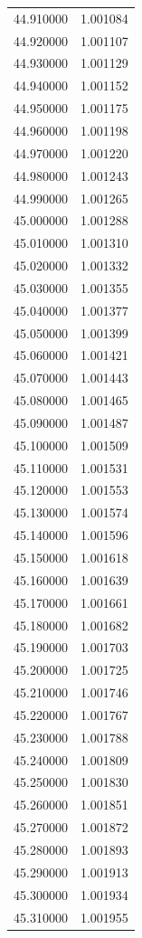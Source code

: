 \begin{tabular}{rr}
44.910000 & 1.001084 \\
44.920000 & 1.001107 \\
44.930000 & 1.001129 \\
44.940000 & 1.001152 \\
44.950000 & 1.001175 \\
44.960000 & 1.001198 \\
44.970000 & 1.001220 \\
44.980000 & 1.001243 \\
44.990000 & 1.001265 \\
45.000000 & 1.001288 \\
45.010000 & 1.001310 \\
45.020000 & 1.001332 \\
45.030000 & 1.001355 \\
45.040000 & 1.001377 \\
45.050000 & 1.001399 \\
45.060000 & 1.001421 \\
45.070000 & 1.001443 \\
45.080000 & 1.001465 \\
45.090000 & 1.001487 \\
45.100000 & 1.001509 \\
45.110000 & 1.001531 \\
45.120000 & 1.001553 \\
45.130000 & 1.001574 \\
45.140000 & 1.001596 \\
45.150000 & 1.001618 \\
45.160000 & 1.001639 \\
45.170000 & 1.001661 \\
45.180000 & 1.001682 \\
45.190000 & 1.001703 \\
45.200000 & 1.001725 \\
45.210000 & 1.001746 \\
45.220000 & 1.001767 \\
45.230000 & 1.001788 \\
45.240000 & 1.001809 \\
45.250000 & 1.001830 \\
45.260000 & 1.001851 \\
45.270000 & 1.001872 \\
45.280000 & 1.001893 \\
45.290000 & 1.001913 \\
45.300000 & 1.001934 \\
45.310000 & 1.001955 \\

\end{tabular}
